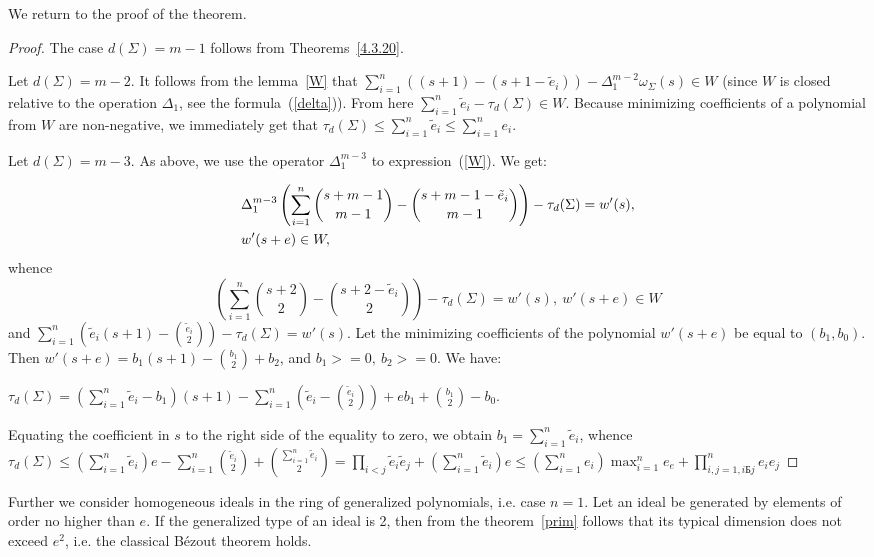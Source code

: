 \documentclass[a4paper,reqno,12pt]{amsart}
\theoremstyle{plain}
\theoremstyle{remark}
\theoremstyle{definition}
\renewcommand{\le}{\leqslant}
\begin{document}
We return to the proof of the theorem.
\begin{proof}
The case $d(\Sigma) = m-1 $ follows  from
Theorems~\ref{4.3.20}.

Let $d (\Sigma) = m-2 $.
It follows from the lemma~\ref{W} that
$\sum_ {i = 1}^n((s + 1) - (s + 1- \tilde e_i)) - \Delta_1 ^ {m-2}
\omega_\Sigma (s) \in W $ (since $W$ is closed relative to the operation
$\Delta_1$, see the formula~(\ref{delta})). From here
$\sum_{i = 1}^ n\tilde e_i- \tau_d (\Sigma) \in W $. 
Because minimizing coefficients of a polynomial from $W$ are 
non-negative,  we immediately get that
$\tau_d (\Sigma) \le \sum_ {i = 1} ^ n \tilde e_i \le \sum_ {i = 1}^ne_i $.

Let $d(\Sigma)=m-3$. As above, we use the operator $\Delta_1^{m-3} $
to expression~(\ref{W}). We get:

\begin{align}
&\Delta_1^{m-3}\left(\sum_{i=1}^n
\binom{s+m-1}{m-1}-\binom{s+m-1-\tilde e_i}{m-1}\right)
 -\tau_d(\Sigma)=w'(s),\notag  \\
& w'(s+e)\in W,  \notag  
\end{align}
whence
$$
\left(\sum_{i=1}^n
\binom{s+2}{2}-\binom{s+2-\tilde e_i}{2}\right)
 -\tau_d(\Sigma)=w'(s),\ w'(s+e)\in W
$$
and $\sum_{i=1}^n (\tilde e_i(s+1)-\binom{\tilde e_i}{2})-\tau_d(\Sigma)=w'(s)$.
Let the minimizing coefficients of the polynomial $w'(s + e)$ be 
equal to $(b_1, b_0)$.
Then $w '(s + e) = b_1 (s + 1)-\binom{b_1}{2} + b_2 $, 
and $ b_1> = 0, \ b_2> = 0 $.
We have:

$\tau_d(\Sigma)=(\sum_{i=1}^n\tilde e_i-b_1)(s+1)-\sum_{i=1}^n(\tilde e_i-\binom{\tilde e_i}{2})+eb_1+\binom{b_1}{2}-b_0
$.

Equating the coefficient in $s$ to the right side of the 
equality to zero, we obtain
$b_1=\sum_{i=1}^n\tilde e_i$, whence $\tau_d(\Sigma)\le(\sum_{i=1}^n\tilde e_i)
e-\sum_{i=1}^n\binom{\tilde e_i}{2}+\binom{\sum_{i=1}^n\tilde e_i}{2}=\prod_{i<j}\tilde e_i\tilde e_j
+(\sum_{i=1}^n\tilde e_i)e\le(\sum_{i=1}^ne_i)\max_{i=1}^ne_e+\prod_{i,j=1,iБ j}^ne_ie_j$
\end{proof}

Further we consider homogeneous
ideals in the ring of generalized polynomials, i.e. case $n = 1$.
Let an ideal be generated by elements of order no higher than $ e $.
If the generalized type of an ideal is 2, then from the theorem~\ref{prim}
follows that
its typical dimension does not exceed $e^2$, i.e. the classical B\'ezout theorem holds.
\end{document}
